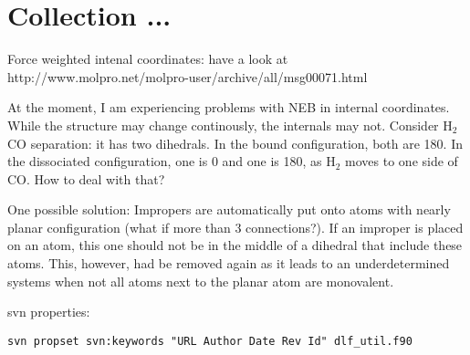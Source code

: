 \documentclass{article}
\begin{document}
\section{Collection ...}

Force weighted intenal coordinates: have a look at
http://www.molpro.net/molpro-user/archive/all/msg00071.html

At the moment, I am experiencing problems with NEB in internal coordinates.
While the structure may change continously, the internals may not. Consider
H$_2$CO separation: it has two dihedrals. In the bound configuration, both are
180\textdegree{}. In the dissociated configuration, one is 0 and one is 180,
as H$_2$ moves to one side of CO. How to deal with that? 

One possible solution: Impropers are automatically put onto atoms with nearly
planar configuration (what if more than 3 connections?). If an improper is
placed on an atom, this one should not be in the middle of a dihedral that
include these atoms. This, however, had be removed again as it leads to an
underdetermined systems when not all atoms next to the planar atom are
monovalent.

svn properties:

\verb'svn propset svn:keywords "URL Author Date Rev Id" dlf_util.f90'

%
%
\end{document}
